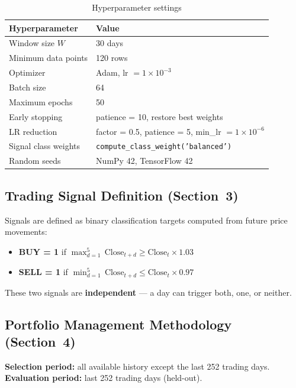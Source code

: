 \documentclass[12pt,a4paper]{article}
\begin{document}
\begin{table}[H]
\centering
\caption{Hyperparameter settings}
\begin{tabular}{ll}
\toprule
\textbf{Hyperparameter} & \textbf{Value} \\
\midrule
Window size $W$          & 30 days \\
Minimum data points      & 120 rows \\
Optimizer                & Adam, lr $= 1\times10^{-3}$ \\
Batch size               & 64 \\
Maximum epochs           & 50 \\
Early stopping           & patience = 10, restore best weights \\
LR reduction             & factor = 0.5, patience = 5, min\_lr $= 1\times10^{-6}$ \\
Signal class weights     & \texttt{compute\_class\_weight('balanced')} \\
Random seeds             & NumPy 42, TensorFlow 42 \\
\bottomrule
\end{tabular}
\end{table}

\subsection{Trading Signal Definition (Section~3)}

Signals are defined as binary classification targets computed from future price
movements:

\begin{itemize}[leftmargin=2em]
  \item \textbf{BUY = 1} if
        $\max_{d=1}^{5}\,\text{Close}_{t+d} \geq \text{Close}_t \times 1.03$
  \item \textbf{SELL = 1} if
        $\min_{d=1}^{5}\,\text{Close}_{t+d} \leq \text{Close}_t \times 0.97$
\end{itemize}

These two signals are \textbf{independent} --- a day can trigger both, one, or
neither.

\subsection{Portfolio Management Methodology (Section~4)}

\textbf{Selection period:} all available history except the last 252 trading
days. \textbf{Evaluation period:} last 252 trading days (held-out).
\end{document}
